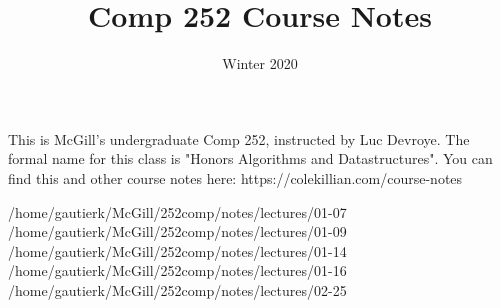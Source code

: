 \documentclass{scrartcl}
\title{Comp 252 Course Notes}
\date{Winter 2020}
\begin{document}
\maketitle

This is McGill’s undergraduate Comp 252, instructed by Luc Devroye. The formal name for this class is "Honors Algorithms and Datastructures". You can find this and other course notes here: https://colekillian.com/course-notes

\tableofcontents



{/home/gautierk/McGill/252comp/notes/lectures/01-07}
{/home/gautierk/McGill/252comp/notes/lectures/01-09}
{/home/gautierk/McGill/252comp/notes/lectures/01-14}
{/home/gautierk/McGill/252comp/notes/lectures/01-16}
{/home/gautierk/McGill/252comp/notes/lectures/02-25}
\end{document}
